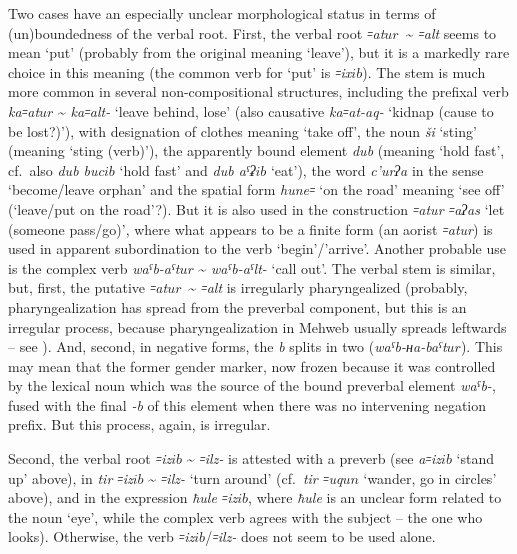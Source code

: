 \documentclass[output=paper]{langsci/langscibook}
\begin{document}
Two cases have an especially unclear morphological status in terms of
(un)boundedness of the verbal root. First, the verbal root
\emph{꞊at\(ur\)}~\textasciitilde{} \emph{꞊alt} seems to mean `put' (probably
from the original meaning `leave'), but it is a markedly rare choice in
this meaning (the common verb for `put' is \emph{꞊ix\(ib\)}). The
stem is much more common in several non-compositional structures,
including the prefixal verb \emph{ka꞊at\(ur\)} \textasciitilde{} \emph{ka꞊alt-}
`leave behind, lose' (also causative \emph{ka꞊at-aq-} `kidnap (cause to
be lost?)'), with designation of clothes meaning `take off', the noun
\emph{ši} `sting' (meaning `sting (verb)'), the apparently bound element
\emph{dub} (meaning `hold fast', cf.\ also \emph{dub buc\(ib\)} `hold fast'
and \emph{dub aˤʡ\(ib\)} `eat'), the word \emph{c'urʔa} in the sense
`become/leave orphan' and the spatial form \emph{hune꞊} `on the road'
meaning `see off' (`leave/put on the road'?). But it is also used in the
construction \emph{꞊atur ꞊aʔas} `let (someone pass/go)', where what
appears to be a finite form (an aorist \emph{꞊atur}) is used in apparent
subordination to the verb `begin'/'arrive'. Another probable use is the
complex verb \emph{waˤb-aˤt\(ur\)} \textasciitilde{} \emph{waˤb-aˤlt-} `call out'.
The verbal stem is similar, but, first, the putative
\emph{꞊at\(ur\)}~\textasciitilde{} \emph{꞊alt} is irregularly pharyngealized
(probably, pharyngealization has spread from the preverbal component,
but this is an irregular process, because pharyngealization in Mehweb
usually spreads leftwards – see \citealt{moroz2019}). And, second, in negative
forms, the \emph{b} splits in two (\emph{waˤb-ʜa-baˤt\(ur\)}). This may
mean that the former gender marker, now frozen because it was controlled
by the lexical noun which was the source of the bound preverbal element
\emph{waˤb-}, fused with the final \emph{-b} of this element when there
was no intervening negation prefix. But this process, again, is
irregular.

Second, the verbal root \emph{꞊iz\(ib\)} \textasciitilde{} \emph{꞊ilz-} is
attested with a preverb (see \emph{a꞊iz\(ib\)} `stand up' above), in
\emph{tir} \emph{꞊iz\(ib\)} \textasciitilde{} \emph{꞊ilz-} `turn
around' (cf.\ \emph{tir ꞊uq\(un\)} `wander, go in circles' above), and in
the expression \emph{ħule} \emph{꞊iz\(ib\)}, where \emph{ħule} is
an unclear form related to the noun `eye', while the complex verb agrees
with the subject – the one who looks). Otherwise, the verb
\emph{꞊iz\(ib\)}/\emph{꞊ilz-} does not seem to be used alone.
\end{document}
